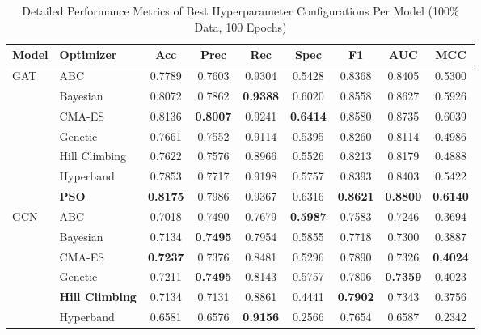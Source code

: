 \documentclass[conference]{IEEEtran}
\begin{document}
\begin{table}[htbp]
\caption{Detailed Performance Metrics of Best Hyperparameter Configurations Per Model (100\% Data, 100 Epochs)}
\label{tab:optimization_detailed}
\centering
\renewcommand{\arraystretch}{1.3}
\begin{tabular}{llccccccc}
\hline
\textbf{Model} & \textbf{Optimizer} & \textbf{Acc} & \textbf{Prec} & \textbf{Rec} & \textbf{Spec} & \textbf{F1} & \textbf{AUC} & \textbf{MCC} \\
\hline
\multirow{7}{*}{GAT}
    & ABC          & 0.7789 & 0.7603          & 0.9304          & 0.5428          & 0.8368 & 0.8405          & 0.5300 \\
    & Bayesian     & 0.8072 & 0.7862          & \textbf{0.9388} & 0.6020          & 0.8558 & 0.8627          & 0.5926 \\
    & CMA-ES       & 0.8136 & \textbf{0.8007} & 0.9241          & \textbf{0.6414} & 0.8580 & 0.8735          & 0.6039 \\
    & Genetic      & 0.7661 & 0.7552          & 0.9114          & 0.5395          & 0.8260 & 0.8114          & 0.4986 \\
    & Hill Climbing& 0.7622 & 0.7576          & 0.8966          & 0.5526          & 0.8213 & 0.8179          & 0.4888 \\
    & Hyperband    & 0.7853 & 0.7717          & 0.9198          & 0.5757          & 0.8393 & 0.8403          & 0.5422 \\
    & \textbf{PSO} & \textbf{0.8175} & 0.7986 & 0.9367          & 0.6316          & \textbf{0.8621} & \textbf{0.8800} & \textbf{0.6140} \\
\hline
\multirow{7}{*}{GCN}
    & ABC          & 0.7018 & 0.7490          & 0.7679          & \textbf{0.5987} & 0.7583 & 0.7246          & 0.3694 \\
    & Bayesian     & 0.7134 & \textbf{0.7495} & 0.7954          & 0.5855          & 0.7718 & 0.7300          & 0.3887 \\
    & CMA-ES       & \textbf{0.7237} & 0.7376 & 0.8481          & 0.5296          & 0.7890 & 0.7326          & \textbf{0.4024} \\
    & Genetic      & 0.7211 & \textbf{0.7495} & 0.8143          & 0.5757          & 0.7806 & \textbf{0.7359} & 0.4023 \\
    & \textbf{Hill Climbing} & 0.7134 & 0.7131 & 0.8861         & 0.4441          & \textbf{0.7902} & 0.7343 & 0.3756 \\
    & Hyperband    & 0.6581 & 0.6576          & \textbf{0.9156} & 0.2566          & 0.7654 & 0.6587          & 0.2342 \\

\end{tabular}
\end{table}
\end{document}
